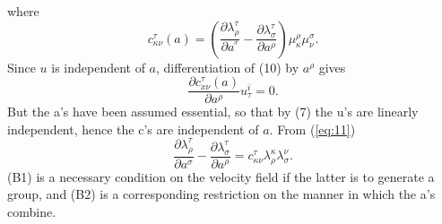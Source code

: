 where
\begin{equation}\label{eq:11}
c_{\kappa \nu}^{\tau}(a) = \left(
\frac{\partial \lambda^{\tau}_{\rho}}{\partial a^{^\sigma}}-
\frac{\partial \lambda_{\sigma}^{\tau}}{\partial a^\rho}
\right)
\mu_{\kappa}^\rho \mu_{\nu}^{\sigma}.
\end{equation}
Since \(u\) is independent of \(a\), differentiation of (10) by \(a^{\rho}\) gives
\[
\frac{\partial c_{x \nu}^\tau(a)}{\partial a^{\rho}} u_\tau^i=0 .
\]
But the a's have been assumed essential, so that by (7) the u's are
linearly independent, hence the c's are independent of \(a\).  From (\ref{eq:11})
\[
\frac{\partial \lambda_{\rho}^{\tau}}{\partial a^{\sigma}} -
 \frac{\partial \lambda_\sigma^\tau}{\partial a^{\rho}} =
c_{\kappa \nu}^{\tau} \lambda_\rho^{\kappa} \lambda_\sigma^\nu. \tag{B2}
\]
(B1) is a necessary condition on the velocity field if the latter is to
generate a group, and (B2) is a corresponding restriction on the manner in which
the a's combine.

